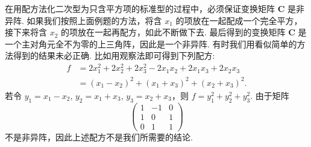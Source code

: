\documentclass[../../main.tex]{subfiles}
\begin{document}
\begin{remark}
在用配方法化二次型为只含平方项的标准型的过程中，必须保证变换矩阵 $\boldsymbol{C}$ 是非异阵. 如果我们按照上面例题的方法，将含 $x_1$ 的项放在一起配成一个完全平方，接下来将含 $x_2$ 的项放在一起再配方，如此不断做下去. 最后得到的变换矩阵 $\boldsymbol{C}$ 是一个主对角元全不为零的上三角阵，因此是一个非异阵. 有时我们用看似简单的方法得到的结果未必正确. 比如用观察法即可得到下列配方:
\begin{align*}
f&=2x_1^2 + 2x_2^2 + 2x_3^2 - 2x_1x_2 + 2x_1x_3 + 2x_2x_3\\
&=(x_1 - x_2)^2 + (x_1 + x_3)^2 + (x_2 + x_3)^2.
\end{align*}
若令 $y_1 = x_1 - x_2$, $y_2 = x_1 + x_3$, $y_3 = x_2 + x_3$，则 $f = y_1^2 + y_2^2 + y_3^2$. 由于矩阵
\[
\begin{pmatrix}
1 & -1 & 0\\
1 & 0 & 1\\
0 & 1 & 1
\end{pmatrix}
\]
不是非异阵，因此上述配方不是我们所需要的结论.
\end{remark}

\vspace{1cm}
\end{document}
